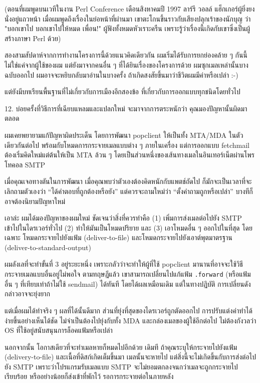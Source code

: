 (ตอนที่ผมพูดบนเวทีในงาน Perl Conference เดือนสิงหาคมปี 1997 ลาร์รี วอลล์
แฮ็กเกอร์ผู้ยิ่งยงนั่งอยู่แถวหน้า เมื่อผมพูดถึงเรื่องในย่อหน้าที่ผ่านมา
เขาตะโกนขึ้นราวกับเสียงปลุกเร้าของนักบุญ ว่า "บอกเขาไป บอกเขาไปให้หมด
เพื่อน!" ผู้ฟังทั้งหมดหัวเราะครืน
เพราะรู้ว่าเรื่องนี้เกิดกับเขาซึ่งเป็นผู้สร้างภาษา Perl ด้วย)

สองสามสัปดาห์จากการทำงานโครงการนี้ด้วยแนวคิดเดียวกัน
ผมเริ่มได้รับการยกย่องคล้าย ๆ  กันนี้ ไม่ใช่แค่จากผู้ใช้ของผม
แต่ยังมาจากคนอื่น ๆ  ที่ได้ยินเรื่องของโครงการด้วย
ผมซุกเมลเหล่านั้นบางฉบับออกไป ผมอาจจะหยิบกลับมาอ่านในบางครั้ง
ถ้าเกิดสงสัยขึ้นมาว่าชีวิตผมมีค่าหรือเปล่า :-)

แต่ยังมีบทเรียนพื้นฐานที่ไม่เกี่ยวกับการเมืองอีกสองข้อ
ที่เกี่ยวกับการออกแบบทุกชนิดโดยทั่วไป

\begin{fancyquotes}
  12. บ่อยครั้งที่วิธีการที่เฉียบแหลมและแปลกใหม่ จะมาจากการตระหนักว่า
  คุณมองปัญหานั้นผิดมาตลอด
\end{fancyquotes}

ผมเคยพยายามแก้ปัญหาผิดประเด็น โดยการพัฒนา popclient ให้เป็นทั้ง MTA/MDA
ในตัวเดียวกันต่อไป พร้อมกับโหมดการกระจายเมลแบบต่าง ๆ  ภายในเครื่อง
แต่การออกแบบ fetchmail ต้องเริ่มคิดใหม่แต่ต้นให้เป็น MTA ล้วน ๆ
โดยเป็นส่วนหนึ่งของเส้นทางเมลในอินเทอร์เน็ตผ่านโพรโทคอล SMTP

เมื่อคุณเจอทางตันในการพัฒนา เมื่อคุณพบว่าตัวเองต้องคิดหนักกับแพตช์ถัดไป
ก็มักจะเป็นเวลาที่จะเลิกถามตัวเองว่า ``ได้คำตอบที่ถูกต้องหรือยัง''
แต่ควรจะถามใหม่ว่า ``ตั้งคำถามถูกหรือเปล่า''
บางทีก็อาจต้องนิยามปัญหาใหม่

เอาล่ะ ผมได้มองปัญหาของผมใหม่ ชัดเจนว่าสิ่งที่ควรทำคือ (1)
เพิ่มการส่งเมลต่อไปยัง SMTP เข้าไปในไดรเวอร์ทั่วไป (2)
ทำให้มันเป็นโหมดปริยาย และ (3) เอาโหมดอื่น ๆ  ออกไปในที่สุด โดยเฉพาะ
โหมดกระจายไปยังแฟ้ม (deliver-to-file) และโหมดกระจายไปยังเอาต์พุตมาตรฐาน
(deliver-to-standard-output)

ผมลังเลที่จะทำขั้นที่ 3 อยู่ระยะหนึ่ง เพราะกลัวว่าจะทำให้ผู้ที่ใช้
popclient มานานที่อาจจะใช้วิธีกระจายเมลแบบอื่นอยู่ไม่พอใจ ตามทฤษฎีแล้ว
เขาสามารถเปลี่ยนไปแก้แฟ้ม \texttt{.forward} (หรือแฟ้มอื่น ๆ
ที่เทียบเท่าถ้าไม่ใช้ sendmail) ได้ทันที โดยได้ผลเหมือนเดิม
แต่ในทางปฏิบัติ การเปลี่ยนดังกล่าวอาจจะยุ่งยาก

แต่เมื่อผมได้ทำจริง ๆ  ผลที่ได้นั้นดีมาก
ส่วนที่ยุ่งที่สุดของไดรเวอร์ถูกตัดออกไป
การปรับแต่งค่าทำได้ง่ายขึ้นอย่างเห็นได้ชัด ไม่จำเป็นต้องไปยุ่งกับทั้ง
MDA และกล่องเมลของผู้ใช้อีกต่อไป ไม่ต้องกังวลว่า OS
ที่ใช้อยู่สนับสนุนการล็อคแฟ้มหรือเปล่า

นอกจากนั้น โอกาสเดียวที่จะทำเมลหายก็หมดไปอีกด้วย เดิมที
ถ้าคุณระบุให้กระจายไปยังแฟ้ม (delivery-to-file)
และเนื้อที่ดิสก์เกิดเต็มขึ้นมา เมลนั้นจะหายไป
แต่สิ่งนี้จะไม่เกิดขึ้นกับการส่งต่อไปยัง SMTP เพราะว่าโปรแกรมรับเมลแบบ
SMTP จะไม่ยอมตกลงจนกว่าเมลจะถูกกระจายไปเรียบร้อย
หรืออย่างน้อยก็ส่งเข้าที่พักไว้ รอการกระจายต่อในภายหลัง

